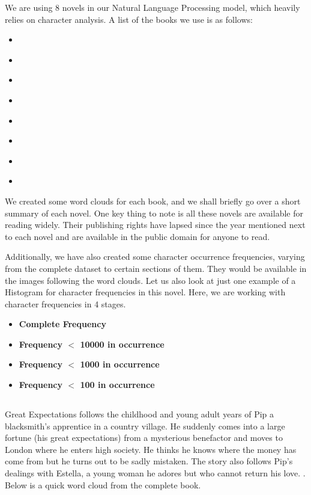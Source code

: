 We are using 8 novels in our Natural Language Processing model, which heavily relies on character analysis. A list of the books we use is as follows:

\begin{itemize}
    \item \textcite{great_expectations}
    \item \textcite{great-gatsby}
    \item \textcite{huckleberry-finn}
    \item \textcite{moby-dick}
    \item \textcite{pride-prejudice}
    \item \textcite{sherlock-holmes}
    \item \textcite{sign-of-the-four}
    \item \textcite{oliver-twist}
\end{itemize}

We created some word clouds for each book, and we shall briefly go over a short summary of each novel. One key thing to note is all these novels are available for reading widely. Their publishing rights have lapsed since the year mentioned next to each novel and are available in the public domain for anyone to read.

Additionally, we have also created some character occurrence frequencies, varying from the complete dataset to certain sections of them. They would be available in the images following the word clouds. Let us also look at just one example of a Histogram for character frequencies in this novel. Here, we are working with character frequencies in 4 stages.

\begin{itemize}
    \item \textbf{Complete Frequency}
    \item \textbf{Frequency $<$ 10000 in occurrence}
    \item \textbf{Frequency $<$ 1000 in occurrence}
    \item \textbf{Frequency $<$ 100 in occurrence}
\end{itemize}
 
\subsection{\textcite{great_expectations}} %
\label{sec:great-expectations} %

Great Expectations follows the childhood and young adult years of Pip a blacksmith's apprentice in a country village. He suddenly comes into a large fortune (his great expectations) from a mysterious benefactor and moves to London where he enters high society. He thinks he knows where the money has come from but he turns out to be sadly mistaken. The story also follows Pip's dealings with Estella, a young woman he adores but who cannot return his love. \textcite{great_expectations-summary}. Below is a quick word cloud from the complete book. 

